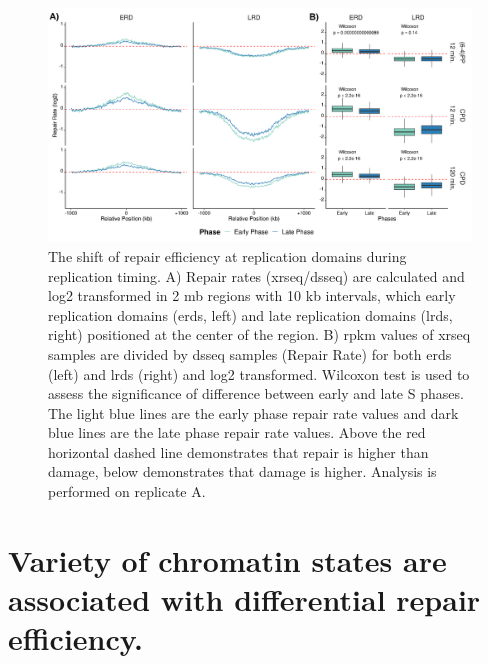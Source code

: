 \begin{figure}[H]
    \begin{center}
    \includegraphics[width=\textwidth]{Chapters/4_results/figures/fig2}
    \caption[The shift of repair efficiency at replication domains during replication timing.]{The shift of repair efficiency at replication domains during replication timing. A) Repair rates (\gls{xrseq}/\gls{dsseq}) are calculated and log2 transformed in 2 \gls{mb} regions with 10 \gls{kb} intervals, which early replication domains (\gls{erd}s, left) and late replication domains (\gls{lrd}s, right) positioned at the center of the region. B) \gls{rpkm} values of \gls{xrseq} samples are divided by \gls{dsseq} samples (Repair Rate) for both \gls{erd}s (left) and \gls{lrd}s (right) and log2 transformed. Wilcoxon test is used to assess the significance of difference between early and late S phases. The light blue lines are the early phase repair rate values and dark blue lines are the late phase repair rate values. Above the red horizontal dashed line demonstrates that repair is higher than damage, below demonstrates that damage is higher. Analysis is performed on replicate A.}
    \label{fig:repdomain}
    \end{center}
    \end{figure}

\section{Variety of chromatin states are associated with differential repair efficiency.}


